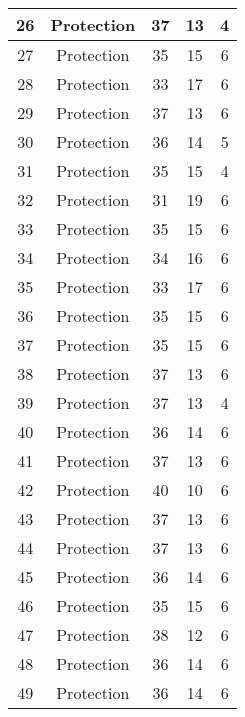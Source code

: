 \documentclass[results.tex]{subfiles}
\begin{document}
\begin{center}
\begin{tabular}{| c || c | c | c | c |}
    \hline
    26 & Protection & 37 & 13 & 4 \\ 
    \hline
    27 & Protection & 35 & 15 & 6 \\ 
    \hline
    28 & Protection & 33 & 17 & 6 \\ 
    \hline
    29 & Protection & 37 & 13 & 6 \\ 
    \hline
    30 & Protection & 36 & 14 & 5 \\ 
    \hline
    31 & Protection & 35 & 15 & 4 \\ 
    \hline
    32 & Protection & 31 & 19 & 6 \\ 
    \hline
    33 & Protection & 35 & 15 & 6 \\ 
    \hline
    34 & Protection & 34 & 16 & 6 \\ 
    \hline
    35 & Protection & 33 & 17 & 6 \\ 
    \hline
    36 & Protection & 35 & 15 & 6 \\ 
    \hline
    37 & Protection & 35 & 15 & 6 \\ 
    \hline
    38 & Protection & 37 & 13 & 6 \\ 
    \hline
    39 & Protection & 37 & 13 & 4 \\ 
    \hline
    40 & Protection & 36 & 14 & 6 \\ 
    \hline
    41 & Protection & 37 & 13 & 6 \\ 
    \hline
    42 & Protection & 40 & 10 & 6 \\ 
    \hline
    43 & Protection & 37 & 13 & 6 \\ 
    \hline
    44 & Protection & 37 & 13 & 6 \\ 
    \hline
    45 & Protection & 36 & 14 & 6 \\ 
    \hline
    46 & Protection & 35 & 15 & 6 \\ 
    \hline
    47 & Protection & 38 & 12 & 6 \\ 
    \hline
    48 & Protection & 36 & 14 & 6 \\ 
    \hline
    49 & Protection & 36 & 14 & 6 \\ 
    \hline   \end{tabular}
\end{center}
\end{document}
